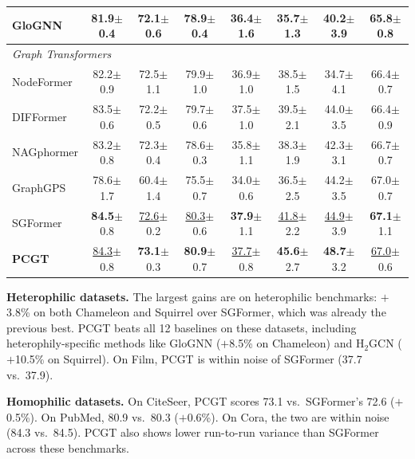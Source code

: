 \documentclass[manuscript, screen, review, anonymous]{acmart}
\newcommand{\best}[1]{\textcolor{bestcolor}{\textbf{#1}}}
\newcommand{\runup}[1]{\textcolor{runnerup}{\underline{#1}}}
\begin{document}
\begin{table}[t]
{\begin{tabular}{l|ccc|cccc}
GloGNN & 81.9{\scriptsize$\pm$0.4} & 72.1{\scriptsize$\pm$0.6} & 78.9{\scriptsize$\pm$0.4} & 36.4{\scriptsize$\pm$1.6} & 35.7{\scriptsize$\pm$1.3} & 40.2{\scriptsize$\pm$3.9} & 65.8{\scriptsize$\pm$0.8} \\
\midrule
\multicolumn{8}{l}{\textit{Graph Transformers}} \\
NodeFormer & 82.2{\scriptsize$\pm$0.9} & 72.5{\scriptsize$\pm$1.1} & 79.9{\scriptsize$\pm$1.0} & 36.9{\scriptsize$\pm$1.0} & 38.5{\scriptsize$\pm$1.5} & 34.7{\scriptsize$\pm$4.1} & 66.4{\scriptsize$\pm$0.7} \\
DIFFormer & 83.5{\scriptsize$\pm$0.6} & 72.2{\scriptsize$\pm$0.5} & 79.7{\scriptsize$\pm$0.6} & 37.5{\scriptsize$\pm$1.0} & 39.5{\scriptsize$\pm$2.1} & 44.0{\scriptsize$\pm$3.5} & 66.4{\scriptsize$\pm$0.9} \\
NAGphormer & 83.2{\scriptsize$\pm$0.8} & 72.3{\scriptsize$\pm$0.4} & 78.6{\scriptsize$\pm$0.3} & 35.8{\scriptsize$\pm$1.1} & 38.3{\scriptsize$\pm$1.9} & 42.3{\scriptsize$\pm$3.1} & 66.7{\scriptsize$\pm$0.7} \\
GraphGPS & 78.6{\scriptsize$\pm$1.7} & 60.4{\scriptsize$\pm$1.4} & 75.5{\scriptsize$\pm$0.7} & 34.0{\scriptsize$\pm$0.6} & 36.5{\scriptsize$\pm$2.5} & 44.2{\scriptsize$\pm$3.5} & 67.0{\scriptsize$\pm$0.7} \\
SGFormer & \best{84.5}{\scriptsize$\pm$0.8} & \runup{72.6}{\scriptsize$\pm$0.2} & \runup{80.3}{\scriptsize$\pm$0.6} & \best{37.9}{\scriptsize$\pm$1.1} & \runup{41.8}{\scriptsize$\pm$2.2} & \runup{44.9}{\scriptsize$\pm$3.9} & \best{67.1}{\scriptsize$\pm$1.1} \\
\midrule
\textbf{PCGT} & \runup{84.3}{\scriptsize$\pm$0.8} & \best{73.1}{\scriptsize$\pm$0.3} & \best{80.9}{\scriptsize$\pm$0.7} & \runup{37.7}{\scriptsize$\pm$0.8} & \best{45.6}{\scriptsize$\pm$2.7} & \best{48.7}{\scriptsize$\pm$3.2} & \runup{67.0}{\scriptsize$\pm$0.6} \\
\bottomrule
\end{tabular}
}%
\end{table}

\textbf{Heterophilic datasets.} The largest gains are on heterophilic benchmarks: $+$3.8\% on both Chameleon and Squirrel over SGFormer, which was already the previous best. PCGT beats all 12 baselines on these datasets, including heterophily-specific methods like GloGNN ($+$8.5\% on Chameleon) and H$_2$GCN ($+$10.5\% on Squirrel). On Film, PCGT is within noise of SGFormer (37.7 vs.\ 37.9).

\textbf{Homophilic datasets.} On CiteSeer, PCGT scores 73.1 vs.\ SGFormer's 72.6 ($+$0.5\%). On PubMed, 80.9 vs.\ 80.3 ($+$0.6\%). On Cora, the two are within noise (84.3 vs.\ 84.5). PCGT also shows lower run-to-run variance than SGFormer across these benchmarks.
\end{document}
